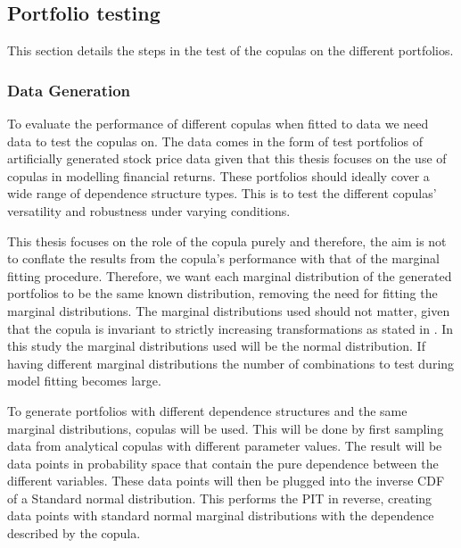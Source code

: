 \subsection{Portfolio testing}\label{sec:PortfolioTesting}
This section details the steps in the test of the copulas on the different portfolios. 

\subsubsection{Data Generation}
To evaluate the performance of different copulas when fitted to data we need data to test the copulas on. The data comes in the form of test portfolios of artificially generated stock price data given that this thesis focuses on the use of copulas in modelling financial returns. These portfolios should ideally cover a wide range of dependence structure types. This is to test the different copulas' versatility and robustness under varying conditions. 

This thesis focuses on the role of the copula purely and therefore, the aim is not to conflate the results from the copula's performance with that of the marginal fitting procedure. Therefore, we want each marginal distribution of the generated portfolios to be the same known distribution, removing the need for fitting the marginal distributions. The marginal distributions used should not matter, given that the copula is invariant to strictly increasing transformations as stated in . In this study the marginal distributions used will be the normal distribution. If having different marginal distributions the number of combinations to test during model fitting becomes large.  

To generate portfolios with different dependence structures and the same marginal distributions, copulas will be used. This will be done by first sampling data from analytical copulas with different parameter values. The result will be data points in probability space that contain the pure dependence between the different variables. These data points will then be plugged into the inverse \gls{CDF} of a Standard normal distribution. This performs the \gls{PIT} in reverse, creating data points with standard normal marginal distributions with the dependence described by the copula. 

